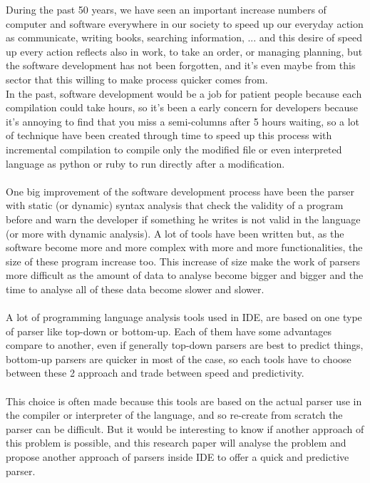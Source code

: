 During the past 50 years, we have seen an important increase numbers of computer and software everywhere in our society to speed up our everyday action as communicate, writing books, searching information, ... and this desire of speed up every action reflects also in work, to take an order, or managing planning, but the software development has not been forgotten, and it's even maybe from this sector that this willing to make process quicker comes from.
\\
In the past, software development would be a job for patient people because each compilation could take hours, so it's been a early concern for developers because it's annoying to find that you miss a semi-columns after 5 hours waiting, so a lot of technique have been created through time to speed up this process with incremental compilation to compile only the modified file or even interpreted language as python or ruby to run directly after a modification.
\\
\\
One big improvement of the software development process have been the parser with static (or dynamic) syntax analysis that check the validity of a program before and warn the developer if something he writes is not valid in the language (or more with dynamic analysis). A lot of tools have been written but, as the software become more and more complex with more and more functionalities, the size of these program increase too. This increase of size make the work of parsers more difficult as the amount of data to analyse become bigger and bigger and the time to analyse all of these data become slower and slower.
\\
\\
A lot of programming language analysis tools used in IDE, are based on one type of parser like top-down or bottom-up. Each of them have some advantages compare to another, even if generally top-down parsers are best to predict things, bottom-up parsers are quicker in most of the case, so each tools have to choose between these 2 approach and trade between speed and predictivity.
\\
\\
This choice is often made because this tools are based on the actual parser use in the compiler or interpreter of the language, and so re-create from scratch the parser can be difficult.
But it would be interesting to know if another approach of this problem is possible, and this research paper will analyse the problem and propose another approach of parsers inside IDE to offer a quick and predictive parser.
